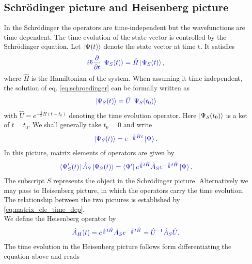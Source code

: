 \documentclass[12pt, titlepage]{article}
\begin{document}
\subsection{Schrödinger picture and Heisenberg picture}
In the Schrödinger the operators are time-independent but the wavefunctions are time dependent. The time evolution of the state vector is controlled by the Schrödinger equation. Let $ \ket{\Psi(t)} $ denote the state vector at time t. It satisfies
\begin{equation}\label{eq:schroedinger}
\textcolor[RGB]{0,0,204}{
i \hbar \frac{\partial }{\partial t} \ket{\Psi_{S}(t)} =
\hat{H} \ket{\Psi_{S}(t)},
}
\end{equation}
where $ \hat{H} $ is the Hamiltonian of the system. When assuming it time independent, the solution of eq. \eqref{eq:schroedinger} can be formally written as 
\begin{equation}
\textcolor[RGB]{0,0,204}{
\ket{\Psi_{S}(t)} 
=\hat{U}\ket{\Psi_{S}(t_0)}
}
\end{equation}
with $ \hat{U} = e^{-\frac{1}{\hbar}\hat{H}(t-t_{0})} $ denoting the time evolution operator. Here $ \ket{\Psi_{S}(t_0)} $ is a ket of $ t=t_{0} $. We shall generally take $ t_{0}=0 $ and write
\begin{equation}
\textcolor[RGB]{0,0,204}{
\ket{\Psi_{S}(t)} 
= e^{-\frac{1}{\hbar}\hat{H}t}
\ket{\Psi}.
}
\end{equation}
In this picture, matrix elements of operators are given by 
\begin{equation}\label{eq:matrix_ele_time_dep}
\textcolor[RGB]{0,0,204}{
\bra{\Psi^{\prime}_{S}(t)}\hat{A}_{S}\ket{\Psi_{S} (t)}
=\bra{\Psi^{\prime}}e^{\frac{i}{\hbar}t\hat{H}}\hat{A}_{S}
e^{-\frac{i}{\hbar}t\hat{H}}\ket{\Psi }
.
}
\end{equation}
The subscript $ S $ represents the object in the Schrödinger picture. Alternatively we may pass to Heisenberg picture, in which the operators carry the time evolution. The relationship between the two pictures is established by \eqref{eq:matrix_ele_time_dep}.\\
We define the Heisenberg operator by
\begin{equation}\label{eq:S-H-Operator_Trafo}
\textcolor[RGB]{0,0,204}{
\hat{A}_{H}(t)=e^{\frac{i}{\hbar}t\hat{H}}\hat{A}_{S}
e^{-\frac{i}{\hbar}t\hat{H}}=\hat{U}^{-1}\hat{A}_{S}\hat{U}.
}
\end{equation}
The time evolution in the Heisenberg picture follows form differentiating the equation above and reads
\end{document}
